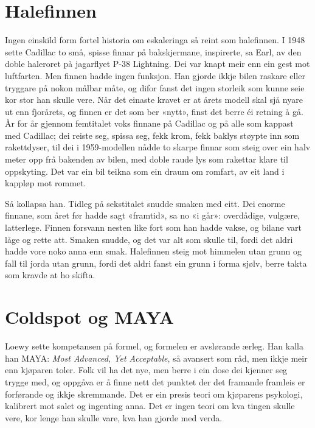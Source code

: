 \section{Halefinnen}

Ingen einskild form fortel historia om eskaleringa så reint som halefinnen. I 1948 sette Cadillac to små, spisse finnar på bakskjermane, inspirerte, sa Earl, av den doble haleroret på jagarflyet P-38 Lightning. Dei var knapt meir enn ein gest mot luftfarten. Men finnen hadde ingen funksjon. Han gjorde ikkje bilen raskare eller tryggare på nokon målbar måte, og difor fanst det ingen storleik som kunne seie kor stor han skulle vere. Når det einaste kravet er at årets modell skal sjå nyare ut enn fjorårets, og finnen er det som ber «nytt», finst det berre éi retning å gå. År for år gjennom femtitalet voks finnane på Cadillac og på alle som kappast med Cadillac; dei reiste seg, spissa seg, fekk krom, fekk baklys støypte inn som rakettdyser, til dei i 1959-modellen nådde to skarpe finnar som steig over ein halv meter opp frå bakenden av bilen, med doble raude lys som rakettar klare til oppskyting. Det var ein bil teikna som ein draum om romfart, av eit land i kappløp mot rommet.

Så kollapsa han. Tidleg på sekstitalet snudde smaken med eitt. Dei enorme finnane, som året før hadde sagt «framtid», sa no «i går»: overdådige, vulgære, latterlege. Finnen forsvann nesten like fort som han hadde vakse, og bilane vart låge og rette att. Smaken snudde, og det var alt som skulle til, fordi det aldri hadde vore noko anna enn smak. Halefinnen steig mot himmelen utan grunn og fall til jorda utan grunn, fordi det aldri fanst ein grunn i forma sjølv, berre takta som kravde at ho skifta.

\section{Coldspot og MAYA}

Loewy sette kompetansen på formel, og formelen er avslørande ærleg. Han kalla han MAYA: \emph{Most Advanced, Yet Acceptable}, så avansert som råd, men ikkje meir enn kjøparen toler. Folk vil ha det nye, men berre i ein dose dei kjenner seg trygge med, og oppgåva er å finne nett det punktet der det framande framleis er forførande og ikkje skremmande. Det er ein presis teori om kjøparens psykologi, kalibrert mot salet og ingenting anna. Det er ingen teori om kva tingen skulle vere, kor lenge han skulle vare, kva han gjorde med verda.

